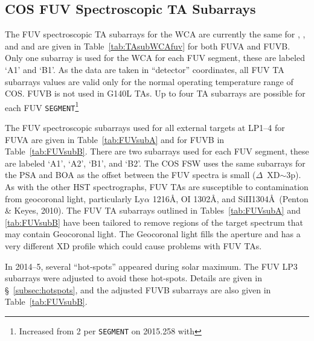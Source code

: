 \subsection{COS FUV Spectroscopic TA Subarrays}\label{subsec:FUVspSUBS}
The FUV spectroscopic TA subarrays for the WCA are currently the same for ,  , and 
and are given in Table~\ref{tab:TAsubWCAfuv} for both FUVA and FUVB.
Only one subarray is used for the WCA for each FUV segment, these are labeled `A1' and `B1'.
As the data are taken in ``detector'' coordinates, all FUV TA subarrays values are valid only for the normal operating temperature range of COS.
FUVB is not used in G140L TAs. Up to four TA subarrays are possible for each FUV \texttt{SEGMENT}\footnote{Increased from 2 per \texttt{SEGMENT} on 2015.258 with }

The FUV spectroscopic subarrays used for all external targets at LP1--4 for FUVA are given in Table~\ref{tab:FUVsubA} and for FUVB in Table~\ref{tab:FUVsubB}.
There are two subarrays used for each FUV segment, these are labeled `A1', `A2', `B1', and `B2'.
The COS FSW uses the same subarrays for the PSA and BOA as the offset between the FUV spectra is small ($\Delta$~XD$\sim$3p).
As with the other HST spectrographs, FUV TAs are susceptible to contamination from geocoronal light, particularly Ly$\alpha$ 1216\AA, {\rm O}\textsc{I} 1302\AA, and {\rm Si}{\sc II}1304\AA\ (Penton \& Keyes, 2010).
The FUV TA subarrays outlined in Tables~\ref{tab:FUVsubA} and \ref{tab:FUVsubB} have been tailored to remove regions
of the target spectrum that may contain Geocoronal light. The Geocoronal light fills the aperture and has a very different XD profile which could cause problems with FUV TAs.

In 2014--5, several ``hot-spots'' appeared during solar maximum. The FUV LP3 subarrays were adjusted to avoid these hot-spots.
Details are given in \S~\ref{subsec:hotspots}, and the adjusted FUVB subarrays are also given in Table~\ref{tab:FUVsubB}.

